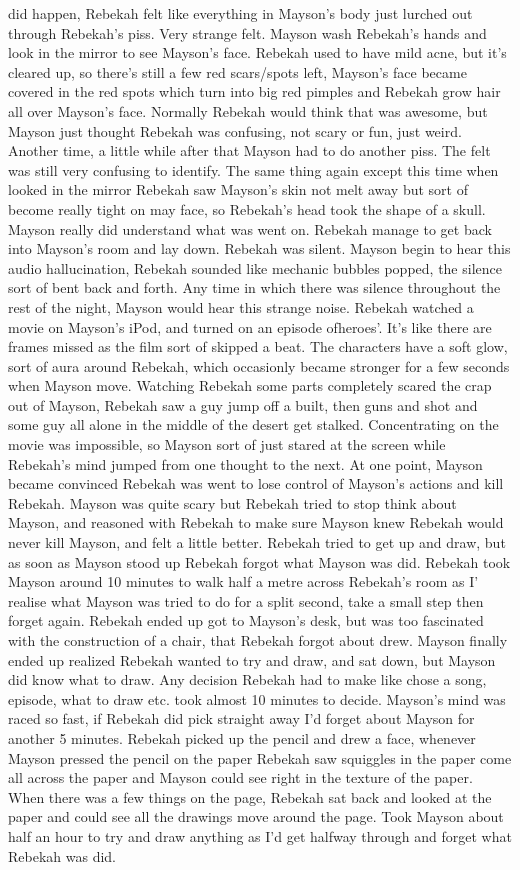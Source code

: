\documentclass[12pt]{book}
\begin{document}
did happen, Rebekah felt like everything in Mayson's body just lurched out through Rebekah's piss. Very strange felt. Mayson wash Rebekah's hands and look in the mirror to see Mayson's face. Rebekah used to have mild acne, but it's cleared up, so there's still a few red scars/spots left, Mayson's face became covered in the red spots which turn into big red pimples and Rebekah grow hair all over Mayson's face. Normally Rebekah would think that was awesome, but Mayson just thought Rebekah was confusing, not scary or fun, just weird. Another time, a little while after that Mayson had to do another piss. The felt was still very confusing to identify. The same thing again except this time when looked in the mirror Rebekah saw Mayson's skin not melt away but sort of become really tight on may face, so Rebekah's head took the shape of a skull. Mayson really did understand what was went on. Rebekah manage to get back into Mayson's room and lay down. Rebekah was silent. Mayson begin to hear this audio hallucination, Rebekah sounded like mechanic bubbles popped, the silence sort of bent back and forth. Any time in which there was silence throughout the rest of the night, Mayson would hear this strange noise. Rebekah watched a movie on Mayson's iPod, and turned on an episode ofheroes'. It's like there are frames missed as the film sort of skipped a beat. The characters have a soft glow, sort of aura around Rebekah, which occasionly became stronger for a few seconds when Mayson move. Watching Rebekah some parts completely scared the crap out of Mayson, Rebekah saw a guy jump off a built, then guns and shot and some guy all alone in the middle of the desert get stalked. Concentrating on the movie was impossible, so Mayson sort of just stared at the screen while Rebekah's mind jumped from one thought to the next. At one point, Mayson became convinced Rebekah was went to lose control of Mayson's actions and kill Rebekah. Mayson was quite scary but Rebekah tried to stop think about Mayson, and reasoned with Rebekah to make sure Mayson knew Rebekah would never kill Mayson, and felt a little better. Rebekah tried to get up and draw, but as soon as Mayson stood up Rebekah forgot what Mayson was did. Rebekah took Mayson around 10 minutes to walk half a metre across Rebekah's room as I' realise what Mayson was tried to do for a split second, take a small step then forget again. Rebekah ended up got to Mayson's desk, but was too fascinated with the construction of a chair, that Rebekah forgot about drew. Mayson finally ended up realized Rebekah wanted to try and draw, and sat down, but Mayson did know what to draw. Any decision Rebekah had to make like chose a song, episode, what to draw etc. took almost 10 minutes to decide. Mayson's mind was raced so fast, if Rebekah did pick straight away I'd forget about Mayson for another 5 minutes. Rebekah picked up the pencil and drew a face, whenever Mayson pressed the pencil on the paper Rebekah saw squiggles in the paper come all across the paper and Mayson could see right in the texture of the paper. When there was a few things on the page, Rebekah sat back and looked at the paper and could see all the drawings move around the page. Took Mayson about half an hour to try and draw anything as I'd get halfway through and forget what Rebekah was did. 
\end{document}

